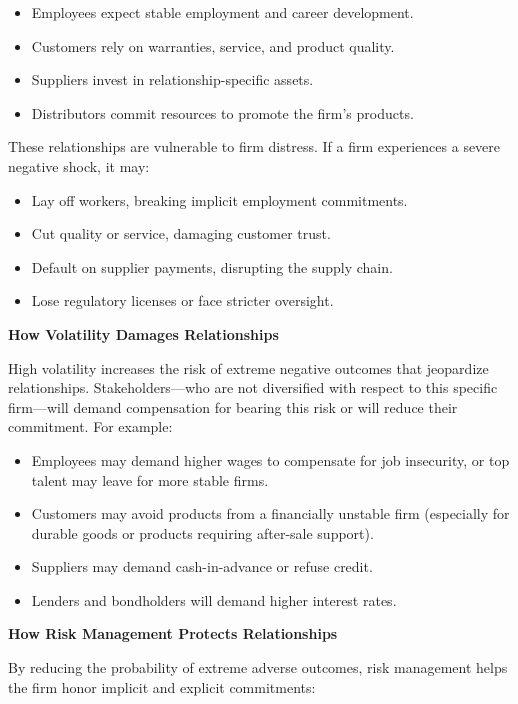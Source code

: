 \documentclass[11pt,openany]{book}
\providecommand{\tightlist}{\setlength{\itemsep}{0pt}\setlength{\parskip}{0pt}}
\begin{document}
\begin{itemize}
\tightlist
\item
  Employees expect stable employment and career development.
\item
  Customers rely on warranties, service, and product quality.
\item
  Suppliers invest in relationship-specific assets.
\item
  Distributors commit resources to promote the firm's products.
\end{itemize}

These relationships are vulnerable to firm distress. If a firm experiences a severe negative shock, it may:

\begin{itemize}
\tightlist
\item
  Lay off workers, breaking implicit employment commitments.
\item
  Cut quality or service, damaging customer trust.
\item
  Default on supplier payments, disrupting the supply chain.
\item
  Lose regulatory licenses or face stricter oversight.
\end{itemize}

\textbf{How Volatility Damages Relationships}

High volatility increases the risk of extreme negative outcomes that jeopardize relationships. Stakeholders---who are not diversified with respect to this specific firm---will demand compensation for bearing this risk or will reduce their commitment. For example:

\begin{itemize}
\tightlist
\item
  Employees may demand higher wages to compensate for job insecurity, or top talent may leave for more stable firms.
\item
  Customers may avoid products from a financially unstable firm (especially for durable goods or products requiring after-sale support).
\item
  Suppliers may demand cash-in-advance or refuse credit.
\item
  Lenders and bondholders will demand higher interest rates.
\end{itemize}

\textbf{How Risk Management Protects Relationships}

By reducing the probability of extreme adverse outcomes, risk management helps the firm honor implicit and explicit commitments:
\end{document}
